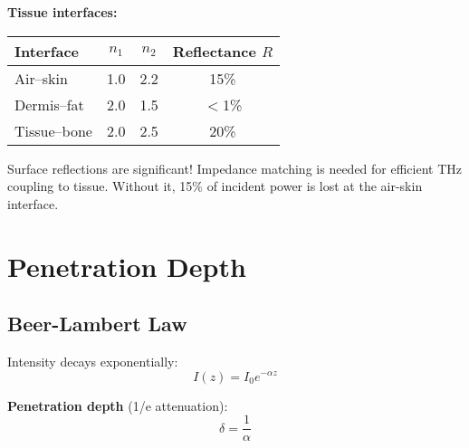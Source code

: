 \textbf{Tissue interfaces:}

\begin{center}
\begin{tabular}{@{}lccc@{}}
\toprule
Interface & $n_1$ & $n_2$ & Reflectance $R$ \\
\midrule
Air--skin & 1.0 & 2.2 & 15\% \\
Dermis--fat & 2.0 & 1.5 & $<$1\% \\
Tissue--bone & 2.0 & 2.5 & 20\% \\
\bottomrule
\end{tabular}
\end{center}

\begin{warningbox}
Surface reflections are significant! Impedance matching is needed for efficient THz coupling to tissue. Without it, 15\% of incident power is lost at the air-skin interface.
\end{warningbox}

\section{Penetration Depth}
\label{sec:penetration-depth}

\subsection{Beer-Lambert Law}
\label{subsec:beer-lambert}

Intensity decays exponentially:
\begin{equation}
\label{eq:beer-lambert}
I(z) = I_0 e^{-\alpha z}
\end{equation}

\textbf{Penetration depth} (1/e attenuation):
\begin{equation}
\label{eq:penetration-depth-def}
\delta = \frac{1}{\alpha}
\end{equation}

